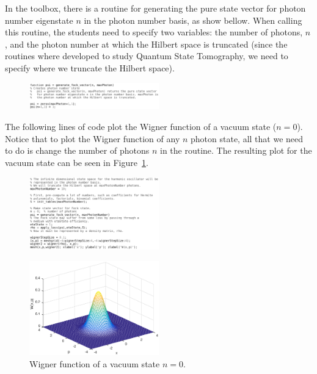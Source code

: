 \documentclass[twocolumn]{rbef}
\begin{document}
In the toolbox, there is a routine for generating the pure state vector for photon number eigenstate $n$ in the photon number basis, as show bellow. When calling this routine, the students need to specify two variables: the number of photons, $n$, and the photon number at which the Hilbert space is truncated (since the routines where developed to study Quantum State Tomography, we need to specify where we truncate the Hilbert space).
\begin{figure}[h]
\includegraphics[width=0.5\textwidth]{generate_fock_vector1.eps}
\end{figure}

The following lines of code plot the Wigner function of a vacuum state ($n =0$). Notice that to plot the Wigner function of any $n$ photon state, all that we need to do is change the number of photons $n$ in the routine. The resulting plot for the vacuum state can be seen in Figure~\ref{fig-W-n=0}.
\begin{figure}[h]
\includegraphics[width=0.5\textwidth]{generate_fock_vector2.eps}
\end{figure}

\begin{figure}[h]
\includegraphics[width=0.5\textwidth]{fockn=0.eps}
\caption{Wigner function of a vacuum state $n=0$.}
\label{fig-W-n=0}
\end{figure}
\end{document}
